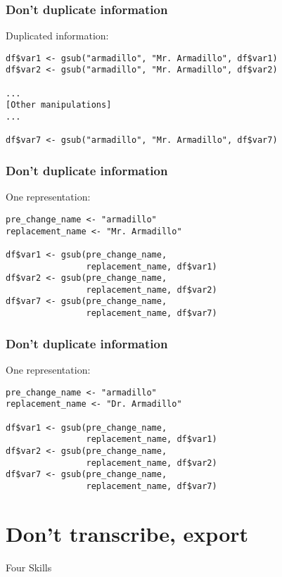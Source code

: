 \documentclass[11pt]{beamer}
\begin{document}
\begin{frame}[fragile]\frametitle{Don't duplicate information}

Duplicated information:
\vspace{1cm}
\begin{verbatim}
df$var1 <- gsub("armadillo", "Mr. Armadillo", df$var1)
df$var2 <- gsub("armadillo", "Mr. Armadillo", df$var2)

...
[Other manipulations]
...

df$var7 <- gsub("armadillo", "Mr. Armadillo", df$var7)
\end{verbatim}
\end{frame}

\begin{frame}[fragile]\frametitle{Don't duplicate information}
One representation:
\vspace{1cm}
\begin{verbatim}
pre_change_name <- "armadillo"
replacement_name <- "Mr. Armadillo"

df$var1 <- gsub(pre_change_name,
                replacement_name, df$var1)
df$var2 <- gsub(pre_change_name,
                replacement_name, df$var2)
df$var7 <- gsub(pre_change_name,
                replacement_name, df$var7)
\end{verbatim}
\end{frame}


\begin{frame}[fragile]\frametitle{Don't duplicate information}
One representation:
\vspace{1cm}
\begin{verbatim}
pre_change_name <- "armadillo"
replacement_name <- "Dr. Armadillo"

df$var1 <- gsub(pre_change_name,
                replacement_name, df$var1)
df$var2 <- gsub(pre_change_name,
                replacement_name, df$var2)
df$var7 <- gsub(pre_change_name,
                replacement_name, df$var7)
\end{verbatim}
\end{frame}

\section{Don't transcribe, export}

\begin{frame}[c]{Four Skills}
    \tableofcontents[currentsection]
\end{frame}
\end{document}
